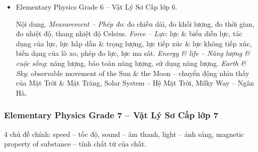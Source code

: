 \documentclass[12pt,oneside]{book}
\begin{document}
\begin{itemize}
	\item Elementary Physics Grade 6 -- Vật Lý Sơ Cấp lớp 6.
	
	{\sf Nội dung.} {\it Measurement -- Phép đo}: đo chiều dài, đo khối lượng, đo thời gian, đo nhiệt độ, thang nhiệt độ Celsius. {\it Force -- Lực}: lực \& biểu diễn lực, tác dụng của lực, lực hấp dẫn \& trọng lượng, lực tiếp xúc \& lực không tiếp xúc, biến dạng của lò xo, phép đo lực, lực ma sát. {\it Energy \& life -- Năng lượng \& cuộc sống}: năng lượng, bảo toàn năng lượng, sử dụng năng lượng. {\it Earth \& Sky}: observable movement of the Sun \& the Moon -- chuyển động nhìn thấy của Mặt Trời \& Mặt Trăng, Solar System -- Hệ Mặt Trời, Milky Way -- Ngân Hà.
\end{itemize}

\subsubsection{Elementary Physics Grade 7 -- Vật Lý Sơ Cấp lớp 7}
4 chủ đề chính: speed -- tốc độ, sound -- âm thanh, light -- ánh sáng, magnetic property of substance -- tính chất từ của chất.
\end{document}
